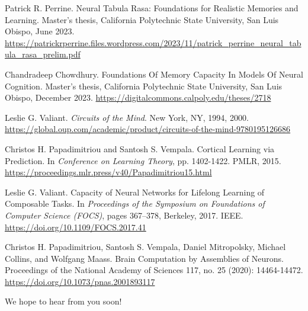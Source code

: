\documentclass{article}
\begin{document}
\begin{thebibliography}{9}
\makeatletter
\addtocounter{\@listctr}{1}
\makeatother

Patrick R. Perrine. Neural Tabula Rasa: Foundations for Realistic Memories and Learning. Master’s thesis, California Polytechnic State University, San Luis Obispo, June 2023. \url{https://patrickrperrine.files.wordpress.com/2023/11/patrick_perrine_neural_tabula_rasa_prelim.pdf}

Chandradeep Chowdhury. Foundations Of Memory Capacity In Models Of Neural Cognition. Master’s thesis, California Polytechnic State University, San Luis Obispo, December 2023. \url{https://digitalcommons.calpoly.edu/theses/2718}

Leslie G. Valiant. \textit{Circuits of the Mind}. New York, NY, 1994, 2000. \url{https://global.oup.com/academic/product/circuits-of-the-mind-9780195126686}

Christos H. Papadimitriou and Santosh S. Vempala. Cortical Learning via Prediction. In \textit{Conference on Learning Theory}, pp. 1402-1422. PMLR, 2015. \url{https://proceedings.mlr.press/v40/Papadimitriou15.html}

Leslie G. Valiant. Capacity of Neural Networks for Lifelong Learning of Composable Tasks. In \textit{Proceedings of the Symposium on Foundations of Computer Science (FOCS)}, pages 367–378, Berkeley, 2017. IEEE. \url{https://doi.org/10.1109/FOCS.2017.41}

Christos H. Papadimitriou, Santosh S. Vempala, Daniel Mitropolsky, Michael Collins, and Wolfgang Maass. Brain Computation by Assemblies of Neurons. Proceedings of the National Academy of Sciences 117, no. 25 (2020): 14464-14472. \url{https://doi.org/10.1073/pnas.2001893117}
\end{thebibliography} 

\vspace{1.5cm}
\begin{center}
{\Large{We hope to hear from you soon!}}
\end{center}
\end{document}
